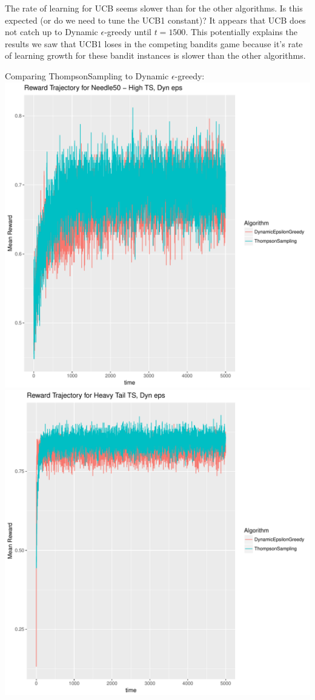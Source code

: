 \documentclass[11pt,letterpaper]{article}
\begin{document}
The rate of learning for UCB seems slower than for the other algorithms. Is this expected (or do we need to tune the UCB1 constant)? It appears that UCB does not catch up to Dynamic $\epsilon$-greedy until $t = 1500$. This potentially explains the results we saw that UCB1 loses in the competing bandits game because it's rate of learning growth for these bandit instances is slower than the other algorithms.

Comparing ThompsonSampling to Dynamic $\epsilon$-greedy: \\
\includegraphics[scale=0.5]{"../results/Reward Trajectory for Needle50 - High TS, Dyn eps"} \\
\includegraphics[scale=0.5]{"../results/Reward Trajectory for Heavy Tail TS, Dyn eps"} \\
\end{document}
